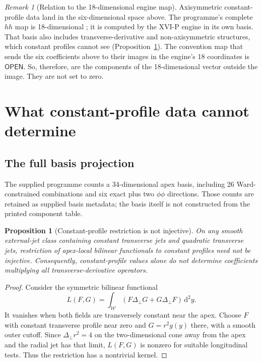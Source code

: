 \documentclass[11pt,a4paper]{article}
\newcommand{\dd}{\mathrm d}
\newcommand{\WW}{\mathcal W}
\newcommand{\OPEN}{\textsf{OPEN}}
\theoremstyle{plain}
\newtheorem{proposition}[theorem]{Proposition}
\theoremstyle{definition}
\theoremstyle{remark}
\newtheorem{remark}[theorem]{Remark}
\numberwithin{equation}{section}
\begin{document}
\begin{remark}[Relation to the 18-dimensional engine map]
Axisymmetric constant-profile data land in the six-dimensional
space above.
The programme's complete \(hh\) map is 18-dimensional
\cite{CheungConeV4,CheungConeV5}; it is computed by the
XVI-P engine in its own basis.
That basis also includes transverse-derivative and non-axisymmetric
structures, which constant profiles cannot see
(Proposition~\ref{prop:noninjective}).
The convention map that sends the six coefficients above to their
images in the engine's 18 coordinates is \(\OPEN\).
So, therefore, are the components of the 18-dimensional vector
outside the image.
They are not set to zero.
\end{remark}

\section{What constant-profile data cannot determine}
\label{sec:missing}

\subsection{The full basis projection}

The supplied programme counts a 34-dimensional apex basis, including
26 Ward-constrained combinations and six exact plus two
\(\phi\phi\) directions. Those counts are retained as supplied
basis metadata; the basis itself is not constructed from the
printed component table.

\begin{proposition}[Constant-profile restriction is not injective]
\label{prop:noninjective}
On any smooth external-jet class containing constant transverse
jets and quadratic transverse jets, restriction of apex-local
bilinear functionals to constant profiles need not be injective.
Consequently, constant-profile values alone do not determine
coefficients multiplying all transverse-derivative operators.
\end{proposition}

\begin{proof}
Consider the symmetric bilinear functional
\[
L(F,G)=
\int_{\WW}
\left(F\Delta_\perp G+G\Delta_\perp F\right)\,\dd^2y.
\]
It vanishes when both fields are transversely constant near the apex.
Choose \(F\) with constant transverse profile near zero and
\(G=r^2g(y)\) there, with a smooth outer cutoff.
Since \(\Delta_\perp r^2=4\) on the two-dimensional cone away
from the apex and the radial jet has that limit,
\(L(F,G)\) is nonzero for suitable longitudinal tests.
Thus the restriction has a nontrivial kernel.
\end{proof}
\end{document}

